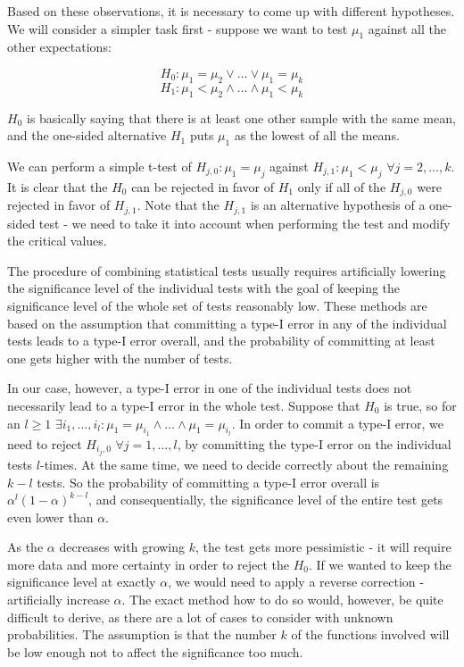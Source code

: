 Based on these observations, it is necessary to come up with different hypotheses. We will consider a simpler task first - suppose we want to test $\mu_1$ against all the other expectations:

\[
H_0: \mu_1 = \mu_2 \vee \dots \vee \mu_1 = \mu_k
\]
\[
H_1: \mu_1 < \mu_2 \wedge \dots \wedge \mu_1 < \mu_k
\]

$H_0$ is basically saying that there is at least one other sample with the same mean, and the one-sided alternative $H_1$ puts $\mu_1$ as the lowest of all the means.

We can perform a simple t-test of $H_{j,0}: \mu_1 = \mu_j$ against $H_{j,1}: \mu_1 < \mu_j$ $\forall j = 2, \dots, k$. It is clear that the $H_0$ can be rejected in favor of $H_1$ only if all of the $H_{j,0}$ were rejected in favor of $H_{j,1}$. Note that the $H_{j,1}$ is an alternative hypothesis of a one-sided test - we need to take it into account when performing the test and modify the critical values.

The procedure of combining statistical tests usually requires artificially lowering the significance level of the individual tests with the goal of keeping the significance level of the whole set of tests reasonably low. These methods are based on the assumption that committing a type-I error in any of the individual tests leads to a type-I error overall, and the probability of committing at least one gets higher with the number of tests.

In our case, however, a type-I error in one of the individual tests does not necessarily lead to a type-I error in the whole test. Suppose that $H_0$ is true, so for an $l \geq 1$ $\exists i_1,\dots,i_l: \mu_1 = \mu_{i_1} \wedge \dots \wedge \mu_1 = \mu_{i_l}$. In order to commit a type-I error, we need to reject $H_{i_j,0}$ $\forall j = 1, \dots, l$, by committing the type-I error on the individual tests $l$-times. At the same time, we need to decide correctly about the remaining $k-l$ tests. So the probability of committing a type-I error overall is $\alpha^l(1-\alpha)^{k-l}$, and consequentially, the significance level of the entire test gets even lower than $\alpha$.

As the $\alpha$ decreases with growing $k$, the test gets more pessimistic - it will require more data and more certainty in order to reject the $H_0$. If we wanted to keep the significance level at exactly $\alpha$, we would need to apply a reverse correction - artificially increase $\alpha$. The exact method how to do so would, however, be quite difficult to derive, as there are a lot of cases to consider with unknown probabilities. The assumption is that the number $k$ of the functions involved will be low enough not to affect the significance too much. 

